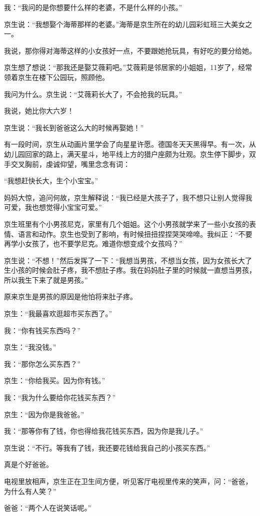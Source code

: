\documentclass[twoside,openright,headings=optiontohead]{ctexbook} %
\begin{document}
{我：``我问的是你想要什么样的老婆，不是什么样的小孩。''

京生说：``我想娶个海蒂那样的老婆。''海蒂是京生所在的幼儿园彩虹班三大美女之一。

我说，那你得对海蒂这样的小女孩好一点，不要跟她抢玩具，有好吃的要分给她。

京生想了想说：``那我还是娶艾薇莉吧。''艾薇莉是邻居家的小姐姐，11岁了，经常领着京生在楼下公园玩，照顾他。

我问为什么。京生说：``艾薇莉长大了，不会抢我的玩具。''

我说，她比你大六岁！

京生说：``我长到爸爸这么大的时候再娶她！''

有一段时间，京生从动画片里学会了向星星许愿。德国冬天天黑得早。有一次，从幼儿园回家的路上，满天星斗，地平线上方的猎户座颇为壮观。京生停下脚步，双手交叉胸前，虔诚仰望，嘴里念念有词：

``我想赶快长大，生个小宝宝。''

妈妈大惊，追问何故，京生解释说：``我已经是大孩子了，我不想只让别人觉得我可爱，我也想觉得小宝宝可爱。''

京生班里有个小男孩尼克，家里有几个姐姐。这个小男孩就学来了一些小女孩的表情、语言和动作。京生也受到了影响，有时候扭扭捏捏哭哭啼啼。我纠正：``不要再学小女孩了，也不要学尼克。难道你想变成个女孩吗？''

京生说：``不想！''然后发挥了一下：``我想当男孩，不想当女孩，因为女孩长大了生小孩的时候会肚子疼，我不想肚子疼。我在妈妈肚子里的时候就一直想当男孩，所以我生下来了就是男孩。''

原来京生是男孩的原因是他怕将来肚子疼。

京生：``我最喜欢逛超市买东西了。''

我：``你有钱买东西吗？''

京生：``我没钱。''

我：``那你怎么买东西？''

京生：``你给我买。因为你有钱。''

我：``我为什么要给你花钱买东西？''

京生：``因为你是我爸爸。''

我：``那等你有了钱，你也得给我花钱买东西，因为你是我儿子。''

京生说：``不行。等我有了钱，我还要花钱给我自己的小孩买东西。''

真是个好爸爸。

电视里放相声，京生正在卫生间方便，听见客厅电视里传来的笑声，问：``爸爸，为什么有人笑？''

爸爸：``两个人在说笑话呢。''

}
\end{document}
